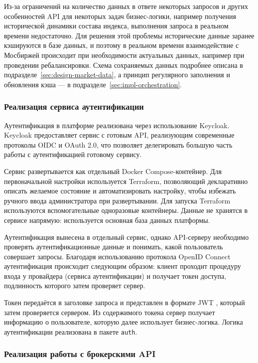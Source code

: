 \documentclass[14pt]{gost-7-32}
\begin{document}
Из-за ограничений на количество данных в ответе некоторых запросов и других особенностей API для некоторых задач бизнес-логики, например получения исторической динамики состава индекса, выполнения запроса в реальном времени недостаточно. Для решения этой проблемы исторические данные заранее кэшируются в базе данных, и поэтому в реальном времени взаимодействие с Мосбиржей происходит при необходимости актуальных данных, например при проведении ребалансировки. Схема сохраняемых данных подробнее описана в подразделе~\ref{sec:design-market-data}, а принцип регулярного заполнения и обновления кэша --- в подразделе~\ref{sec:impl-orchestration}.

\subsubsection{Реализация сервиса аутентификации}

Аутентификация в платформе реализована через использование Keycloak. Keycloak предоставляет сервис с готовым API, реализующим современные протоколы OIDC и OAuth 2.0, что позволяет делегировать большую часть работы с аутентификацией готовому сервису.

Сервис развертывается как отдельный Docker Compose-контейнер. Для первоначальной настройки используется Terraform, позволяющий декларативно описать желаемое состояние и автоматизировать настройку, чтобы избежать ручного ввода администратора при развертывании. Для запуска Terraform используются вспомогательные одноразовые контейнеры. Данные не хранятся в сервисе напрямую: используется основная база данных платформы.

Аутентификация вынесена в отдельный сервис, однако API-серверу необходимо проверять аутентификационные данные и понимать, какой пользователь совершает запросы. Благодаря использованию протокола OpenID Connect \cite{openidConnectCore} аутентификация происходит следующим образом: клиент проходит процедуру входа у провайдера (сервиса аутентификации) и получает токен доступа, подлинность которого затем проверяет сервер.

Токен передаётся в заголовке запроса и представлен в формате JWT \cite{rfc7519Jwt}, который затем проверяется сервером. Из содержимого токена сервер получает информацию о пользователе, которую далее использует бизнес-логика. Логика аутентификации реализована в пакете \texttt{auth}.

\subsubsection{Реализация работы с брокерскими API}
\label{sec:impl-broker-api}
\end{document}
